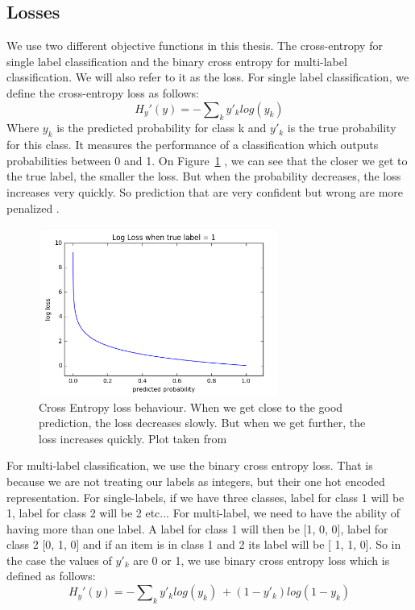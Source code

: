\subsection{Losses} \label{sec:loss}
We use two different objective functions in this thesis. The cross-entropy for single label classification and the binary cross entropy for multi-label classification. We will also refer to it as the loss. 
For single label classification, we define the cross-entropy loss as follows: \[H_y'(y) = - \sum\nolimits_k y'_k log(y_k)\] Where \(y_k\) is the predicted probability for class k and \(y'_k\) is the true probability for this class. It measures the performance of a classification which outputs probabilities between 0 and 1. On  Figure~\ref{fig:CE} , we can see that the closer we get to the true label, the smaller the loss. But when the probability decreases, the loss increases very quickly. So prediction that are very confident but wrong are more penalized \cite{nnbook}.
\begin{figure}[!htp]
    \centering
        \includegraphics[width=0.7\textwidth]{figures/02-cross_entropy}
        \caption[Cross Entropy loss behaviour]{Cross Entropy loss behaviour. When we get close to the good prediction, the loss decreases slowly. But when we get further, the loss increases quickly. Plot taken from \cite{celoss}}
        \label{fig:CE}
\end{figure}


For multi-label classification, we use the binary cross entropy loss. That is because we are not treating our labels as integers, but their one hot encoded representation. For single-labels, if we have three classes, label for class 1 will be 1, label for class 2 will be 2 etc...  For multi-label, we need to have the ability of having more than one label. A label for class 1 will then be [1, 0, 0], label for class 2 [0, 1, 0] and if an item is in class 1 and 2 its label will be [ 1, 1, 0]. So in the case the values of \(y'_k\) are 0 or 1, we use binary cross entropy loss which is defined as follows: \[H_y'(y) = - \sum\nolimits_k y'_k log(y_k)\ + (1 - y'_k)log(1 - y_k) \]


